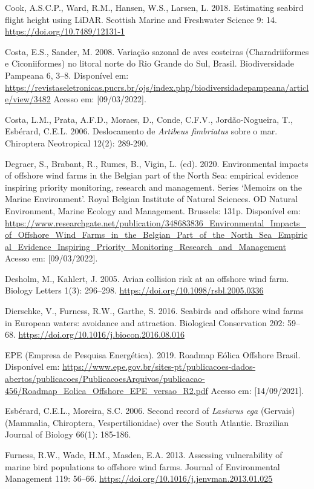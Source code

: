 \documentclass[
  oneside]{scrbook}
\begin{document}
Cook, A.S.C.P., Ward, R.M., Hansen, W.S., Larsen, L. 2018. Estimating seabird flight height using LiDAR. Scottish Marine and Freshwater Science 9: 14. \url{https://doi.org/10.7489/12131-1}

Costa, E.S., Sander, M. 2008. Variação sazonal de aves costeiras (Charadriiformes e Ciconiiformes) no litoral norte do Rio Grande do Sul, Brasil. Biodiversidade Pampeana 6, 3--8. Disponível em: \url{https://revistaseletronicas.pucrs.br/ojs/index.php/biodiversidadepampeana/article/view/3482} Acesso em: {[}09/03/2022{]}.

Costa, L.M., Prata, A.F.D., Moraes, D., Conde, C.F.V., Jordão-Nogueira, T., Esbérard, C.E.L. 2006. Deslocamento de \emph{Artibeus fimbriatus} sobre o mar. Chiroptera Neotropical 12(2): 289-290.

Degraer, S., Brabant, R., Rumes, B., Vigin, L. (ed). 2020. Environmental impacts of offshore wind farms in the Belgian part of the North Sea: empirical evidence inspiring priority monitoring, research and management. Series `Memoirs on the Marine Environment'. Royal Belgian Institute of Natural Sciences. OD Natural Environment, Marine Ecology and Management. Brussels: 131p. Disponível em: \url{https://www.researchgate.net/publication/348683836_Environmental_Impacts_of_Offshore_Wind_Farms_in_the_Belgian_Part_of_the_North_Sea_Empirical_Evidence_Inspiring_Priority_Monitoring_Research_and_Management} Acesso em: {[}09/03/2022{]}.

Desholm, M., Kahlert, J. 2005. Avian collision risk at an offshore wind farm. Biology Letters 1(3): 296--298. \url{https://doi.org/10.1098/rsbl.2005.0336}

Dierschke, V., Furness, R.W., Garthe, S. 2016. Seabirds and offshore wind farms in European waters: avoidance and attraction. Biological Conservation 202: 59--68. \url{https://doi.org/10.1016/j.biocon.2016.08.016}

EPE (Empresa de Pesquisa Energética). 2019. Roadmap Eólica Offshore Brasil. Disponível em: \url{https://www.epe.gov.br/sites-pt/publicacoes-dados-abertos/publicacoes/PublicacoesArquivos/publicacao-456/Roadmap_Eolica_Offshore_EPE_versao_R2.pdf} Acesso em: {[}14/09/2021{]}.

Esbérard, C.E.L., Moreira, S.C. 2006. Second record of \emph{Lasiurus ega} (Gervais) (Mammalia, Chiroptera, Vespertilionidae) over the South Atlantic. Brazilian Journal of Biology 66(1): 185-186.

Furness, R.W., Wade, H.M., Masden, E.A. 2013. Assessing vulnerability of marine bird populations to offshore wind farms. Journal of Environmental Management 119: 56--66. \url{https://doi.org/10.1016/j.jenvman.2013.01.025}
\end{document}
